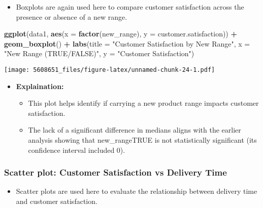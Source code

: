 \documentclass[
]{article}
\newenvironment{Shaded}{\begin{snugshade}}{\end{snugshade}}
\newcommand{\AttributeTok}[1]{\textcolor[rgb]{0.13,0.29,0.53}{#1}}
\newcommand{\FunctionTok}[1]{\textcolor[rgb]{0.13,0.29,0.53}{\textbf{#1}}}
\newcommand{\NormalTok}[1]{#1}
\newcommand{\SpecialCharTok}[1]{\textcolor[rgb]{0.81,0.36,0.00}{\textbf{#1}}}
\newcommand{\StringTok}[1]{\textcolor[rgb]{0.31,0.60,0.02}{#1}}
\providecommand{\tightlist}{%
  \setlength{\itemsep}{0pt}\setlength{\parskip}{0pt}}
\begin{document}
\begin{itemize}
\tightlist
\item
  Boxplots are again used here to compare customer satisfaction across
  the presence or absence of a new range.
\end{itemize}

\begin{Shaded}
\begin{Highlighting}[]
\FunctionTok{ggplot}\NormalTok{(data1, }\FunctionTok{aes}\NormalTok{(}\AttributeTok{x =} \FunctionTok{factor}\NormalTok{(new\_range), }\AttributeTok{y =}\NormalTok{ customer.satisfaction)) }\SpecialCharTok{+}
  \FunctionTok{geom\_boxplot}\NormalTok{() }\SpecialCharTok{+}
  \FunctionTok{labs}\NormalTok{(}\AttributeTok{title =} \StringTok{"Customer Satisfaction by New Range"}\NormalTok{,}
       \AttributeTok{x =} \StringTok{"New Range (TRUE/FALSE)"}\NormalTok{,}
       \AttributeTok{y =} \StringTok{"Customer Satisfaction"}\NormalTok{)}
\end{Highlighting}
\end{Shaded}

\texttt{[image: 5608651\_files/figure-latex/unnamed-chunk-24-1.pdf]}

\begin{itemize}
\tightlist
\item
  \textbf{Explaination:}

  \begin{itemize}
  \tightlist
  \item
    This plot helps identify if carrying a new product range impacts
    customer satisfaction.
  \item
    The lack of a significant difference in medians aligns with the
    earlier analysis showing that new\_rangeTRUE is not statistically
    significant (its confidence interval included 0).
  \end{itemize}
\end{itemize}

\subsubsection{Scatter plot: Customer Satisfaction vs Delivery
Time}\label{scatter-plot-customer-satisfaction-vs-delivery-time}

\begin{itemize}
\tightlist
\item
  Scatter plots are used here to evaluate the relationship between
  delivery time and customer satisfaction.
\end{itemize}
\end{document}

